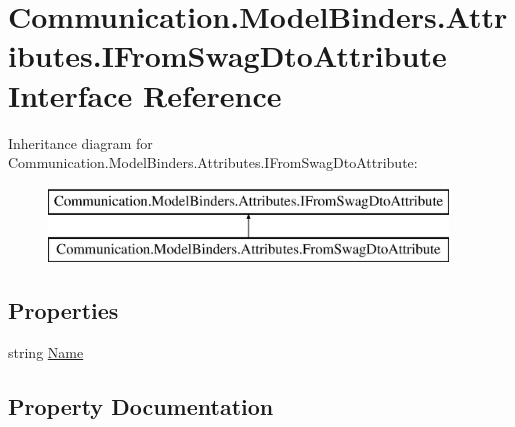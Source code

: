 \hypertarget{interface_communication_1_1_model_binders_1_1_attributes_1_1_i_from_swag_dto_attribute}{}\section{Communication.\+Model\+Binders.\+Attributes.\+I\+From\+Swag\+Dto\+Attribute Interface Reference}
\label{interface_communication_1_1_model_binders_1_1_attributes_1_1_i_from_swag_dto_attribute}
Inheritance diagram for Communication.\+Model\+Binders.\+Attributes.\+I\+From\+Swag\+Dto\+Attribute\+:\begin{figure}[H]
\begin{center}
\leavevmode
\includegraphics[height=2.000000cm]{interface_communication_1_1_model_binders_1_1_attributes_1_1_i_from_swag_dto_attribute}
\end{center}
\end{figure}
\subsection*{Properties}
\begin{DoxyCompactItemize}
\item 
string \mbox{\hyperlink{interface_communication_1_1_model_binders_1_1_attributes_1_1_i_from_swag_dto_attribute_a7d6647dfb2d0e32ea5721206c20316c3}{Name}}
\end{DoxyCompactItemize}


\subsection{Property Documentation}
\mbox{\label{interface_communication_1_1_model_binders_1_1_attributes_1_1_i_from_swag_dto_attribute_a7d6647dfb2d0e32ea5721206c20316c3}} 
